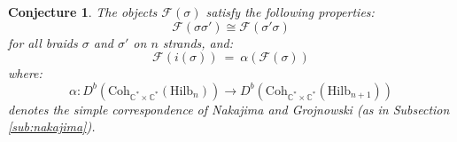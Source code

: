 \documentclass[12pt]{amsart}
\numberwithin{equation}{section}
\newtheorem{conjecture}[theorem]{Conjecture}
\theoremstyle{definition}
\theoremstyle{remark}
\newcommand{\CC}{\mathbb{C}}
\newcommand{\CB}{\mathcal{B}}
\newcommand{\CO}{\mathcal{O}}
\newcommand{\CF}{\mathcal{F}}
\newcommand{\CT}{\mathcal{T}}
\renewcommand{\1}{\mathbf{1}}
\newcommand{\coh}{\mathrm{Coh}}
\newcommand{\FH}{\mathrm{FHilb}}
\renewcommand{\H}{\mathrm{Hilb}}
\newcommand{\SBim}{\mathrm{SBim}}
\newcommand{\torus}{\CC^{*} \times \CC^*}
\newcommand{\dg}{\text{dg}}%
\newcommand{\tot}{\mathrm{Tot}}
\begin{document}


\begin{conjecture}
\label{conj:2}
The objects $\CF(\sigma)$ satisfy the following properties:
\begin{equation}
\label{eqn:nakajima 0}
\CF(\sigma \sigma') \cong \CF(\sigma' \sigma)
\end{equation}
for all braids $\sigma$ and $\sigma'$ on $n$ strands, and:
\begin{equation}
\label{eqn:nakajima 1}
\CF(i(\sigma)) \ = \ \alpha\left(\CF(\sigma)\right)
\end{equation}
where:
\begin{equation}
\label{eqn:nakajima}
\alpha:D^b\left(\coh_{\CC^* \times \CC^*} \left(\H_n \right)\right) \longrightarrow D^b\left(\coh_{\CC^* \times \CC^*} \left(\H_{n+1} \right)\right)
\end{equation}
denotes the simple correspondence of Nakajima and Grojnowski (as in Subsection \ref{sub:nakajima}). 


\end{conjecture}
\end{document}
